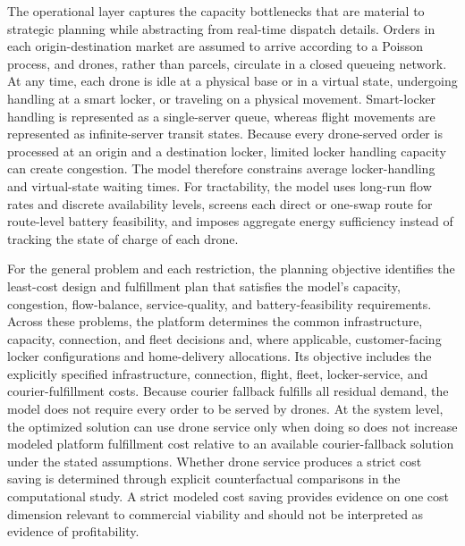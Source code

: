 \documentclass[final,3p,authoryear]{elsarticle}
\begin{document}
The operational layer captures the capacity bottlenecks that are material to strategic planning while abstracting from real-time dispatch details. Orders in each origin-destination market are assumed to arrive according to a Poisson process, and drones, rather than parcels, circulate in a closed queueing network. At any time, each drone is idle at a physical base or in a virtual state, undergoing handling at a smart locker, or traveling on a physical movement. Smart-locker handling is represented as a single-server queue, whereas flight movements are represented as infinite-server transit states. Because every drone-served order is processed at an origin and a destination locker, limited locker handling capacity can create congestion. The model therefore constrains average locker-handling and virtual-state waiting times. For tractability, the model uses long-run flow rates and discrete availability levels, screens each direct or one-swap route for route-level battery feasibility, and imposes aggregate energy sufficiency instead of tracking the state of charge of each drone.

\color{blue}
For the general problem and each restriction, the planning objective identifies the least-cost design and fulfillment plan that satisfies the model's capacity, congestion, flow-balance, service-quality, and battery-feasibility requirements.
Across these problems, the platform determines the common infrastructure, capacity, connection, and fleet decisions and, where applicable, customer-facing locker configurations and home-delivery allocations.
Its objective includes the explicitly specified infrastructure, connection, flight, fleet, locker-service, and courier-fulfillment costs.
Because courier fallback fulfills all residual demand, the model does not require every order to be served by drones.
At the system level, the optimized solution can use drone service only when doing so does not increase modeled platform fulfillment cost relative to an available courier-fallback solution under the stated assumptions.
Whether drone service produces a strict cost saving is determined through explicit counterfactual comparisons in the computational study.
A strict modeled cost saving provides evidence on one cost dimension relevant to commercial viability and should not be interpreted as evidence of profitability.
\end{document}
